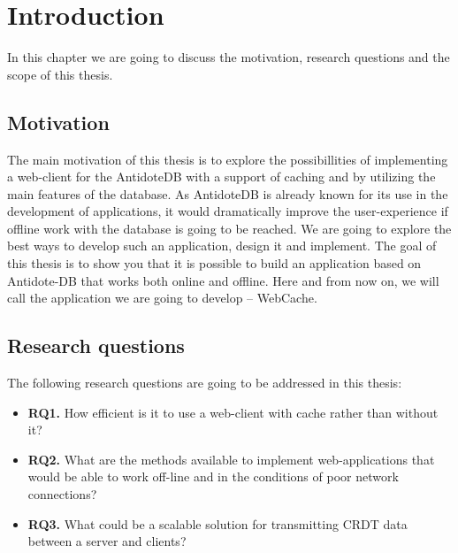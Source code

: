 \chapter{Introduction}
\label{Introduction}

In this chapter we are going to discuss the motivation, research questions and the scope of this thesis.

\section{Motivation}

The main motivation of this thesis is to explore the possibillities of implementing a web-client for the AntidoteDB with a support of caching and by utilizing the main features of the database. As AntidoteDB is already known for its use in the development of applications, it would dramatically improve the user-experience if offline work with the database is going to be reached. We are going to explore the best ways to develop such an application, design it and implement. The goal of this thesis is to show you that it is possible to build an application based on Antidote-DB that works both online and offline. Here and from now on, we will call the application we are going to develop -- WebCache.


\section{Research questions}

The following research questions are going to be addressed in this thesis:

\begin{itemize}
    \item \textbf{RQ1.} How efficient is it to use a web-client with cache rather than without it?
    \item \textbf{RQ2.} What are the methods available to implement web-applications that would be able to work off-line and
    in the conditions of poor network connections?
    \item \textbf{RQ3.} What could be a scalable solution for transmitting CRDT data between a server and clients?
  \end{itemize}





